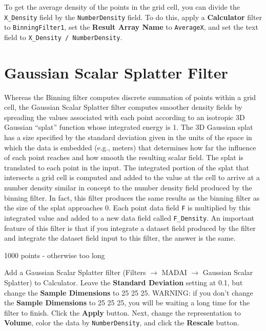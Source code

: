 \documentclass[12pt]{article}
\begin{document}
To get the average density of the points in the grid cell, you can divide the \texttt{X\_Density} field by the \texttt{NumberDensity} field. To do this, apply a \textbf{Calculator} filter to \texttt{BinningFilter1}, set the \textbf{Result Array Name} to \texttt{AverageX}, and set the text field to \texttt{X\_Density / NumberDensity}. 

\section{Gaussian Scalar Splatter Filter}

Whereas the Binning filter computes discrete summation of points within a grid cell, the Gaussian Scalar Splatter filter computes smoother density fields by spreading the values associated with each point according to an isotropic 3D Gaussian ``splat'' function whose integrated energy is 1. The 3D Gaussian splat has a size specified by the standard deviation given in the units of the space in which the data is embedded (e.g., meters) that determines how far the influence of each point reaches and how smooth the resulting scalar field. The splat is translated to each point in the input. The integrated portion of the splat that intersects a grid cell is computed and added to the value at the cell to arrive at a number density similar in concept to the number density field produced by the binning filter. In fact, this filter produces the same results as the binning filter as the size of the splat approaches 0. Each point data field \texttt{F} is multiplied by this integrated value and added to a new data field called \texttt{F\_Density}. An important feature of this filter is that if you integrate a dataset field produced by the filter and integrate the dataset field input to this filter, the answer is the same.

1000 points - otherwise too long

Add a Gaussian Scalar Splatter filter (Filters $\rightarrow$ MADAI $\rightarrow$ Gaussian Scalar Splatter) to Calculator. Leave the \textbf{Standard Deviation} setting at 0.1, but change the \textbf{Sample Dimensions} to 25 25 25. WARNING: if you don't change the \textbf{Sample Dimensions} to 25 25 25, you will be waiting a long time for the filter to finish. Click the \textbf{Apply} button. Next, change the representation to \textbf{Volume}, color the data by \texttt{NumberDensity}, and click the \textbf{Rescale} button.
\end{document}
